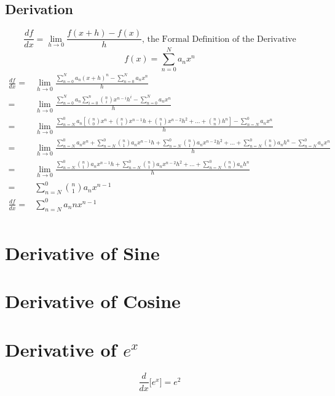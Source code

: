 \documentclass[11pt]{book}
\begin{document}
\subsection{Derivation}
\[\frac{df}{dx} = \lim_{h\to0}\frac{f(x+h) -f(x)}{h} \text{, the Formal Definition of the Derivative}\]
\[f(x) = \sum\limits_{n=0}^N{a_n x^n}\]
\begin{align*}
\frac{df}{dx} =&  \lim_{h\to0}\frac{\sum\limits_{n=0}^N{a_n (x+h)^n} - \sum\limits_{n=0}^N{a_n x^n}}{h} \\
=&  \lim_{h\to0}\frac{\sum\limits_{n=0}^N{a_n \sum\limits_{i=0}^n{{n \choose i}x^{n-i}h^i}} - \sum\limits_{n=0}^N{a_n x^n}}{h} \\
=&  \lim_{h\to0}\frac{
\sum\limits_{n=N}^0{a_n [{n\choose0}x^n + {n\choose1}x^{n-1}h+ {n\choose1}x^{n-2}h^2 + ... + {n\choose n}h^n]} - \sum\limits_{n=N}^0{a_n x^n}}
{h} \\
=&  \lim_{h\to0}\frac{\sum\limits_{n=N}^0{a_n x^n} + \sum\limits_{n=N}^0{{n\choose1} a_n x^{n-1}h} + \sum\limits_{n=N}^0{{n\choose1} a_n x^{n-2}h^2 + ... + \sum\limits_{n=N}^0{{n\choose n} a_n h^n}} - \sum\limits_{n=N}^0{a_n x^n}}{h} \\
=&  \lim_{h\to0} \frac{ 
\sum\limits_{n=N}^0{ {n\choose1} a_n x^{n-1}h   } + 
\sum\limits_{n=N}^0{ {n\choose1} a_n x^{n-2}h^2 } + ... + 
\sum\limits_{n=N}^0{ {n\choose n}a_n      h^n}  }{h} \\
=& \sum\limits_{n=N}^0{ {n\choose1} a_n x^{n-1}  }\\
\frac{df}{dx} =& \sum\limits_{n=N}^0{ a_n n x^{n-1}  }\\
\end{align*}

\section{Derivative of Sine}
\section{Derivative of Cosine}

\section{Derivative of $e^x$}
\[ \frac{d}{dx}\bigg[e^x \bigg] = e^2 \]
\end{document}

